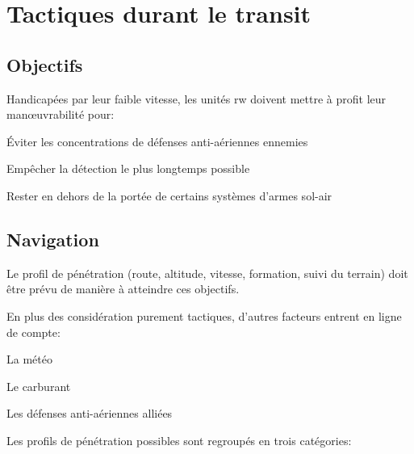 \section{Tactiques durant le transit}

\subsection{Objectifs}

\e
    \item Handicapées par leur faible vitesse, les unités \gls{rw} doivent mettre à profit leur manœuvrabilité pour:
    \ee
        \item Éviter les concentrations de défenses anti-aériennes ennemies
        \item Empêcher la détection le plus longtemps possible
        \item Rester en dehors de la portée de certains systèmes d’armes sol-air
    \ed
\ed

\subsection{Navigation}

\e
    \item Le profil de pénétration (route, altitude, vitesse, formation, suivi du terrain) doit être prévu de manière à atteindre ces objectifs.
    \item En plus des considération purement tactiques, d’autres facteurs entrent en ligne de compte:
    \ee
        \item La météo
        \item Le carburant
        \item Les défenses anti-aériennes alliées
    \ed
    \item Les profils de pénétration possibles sont regroupés en trois catégories:
\ed

